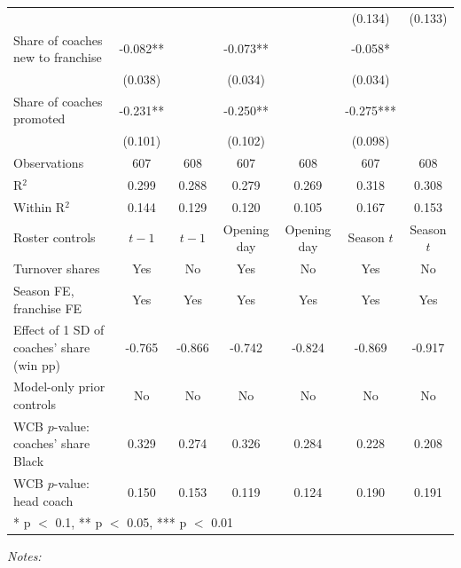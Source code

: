 \begin{table}[!h]
{\begin{threeparttable}
\begin{tabular}[t]{lcccccc}
 &  &  &  &  & (0.134) & (0.133)\\
Share of coaches new to franchise & -0.082** &  & -0.073** &  & -0.058* & \\
 & (0.038) &  & (0.034) &  & (0.034) & \\
Share of coaches promoted & -0.231** &  & -0.250** &  & -0.275*** & \\
 & (0.101) &  & (0.102) &  & (0.098) & \\
\midrule
Observations & 607 & 608 & 607 & 608 & 607 & 608\\
R$^2$ & 0.299 & 0.288 & 0.279 & 0.269 & 0.318 & 0.308\\
Within R$^2$ & 0.144 & 0.129 & 0.120 & 0.105 & 0.167 & 0.153\\
Roster controls & $t-1$ & $t-1$ & Opening day & Opening day & Season $t$ & Season $t$\\
Turnover shares & Yes & No & Yes & No & Yes & No\\
Season FE, franchise FE & Yes & Yes & Yes & Yes & Yes & Yes\\
Effect of 1 SD of coaches' share (win pp) & -0.765 & -0.866 & -0.742 & -0.824 & -0.869 & -0.917\\
Model-only prior controls & No & No & No & No & No & No\\
WCB $p$-value: coaches' share Black & 0.329 & 0.274 & 0.326 & 0.284 & 0.228 & 0.208\\
WCB $p$-value: head coach & 0.150 & 0.153 & 0.119 & 0.124 & 0.190 & 0.191\\
\bottomrule
\multicolumn{7}{l}{\rule{0pt}{1em}* p $<$ 0.1, ** p $<$ 0.05, *** p $<$ 0.01}\\
\end{tabular}
\begin{tablenotes}[para]
\item \textit{Notes:} 

\end{tablenotes}
\end{threeparttable}}
\end{table}
